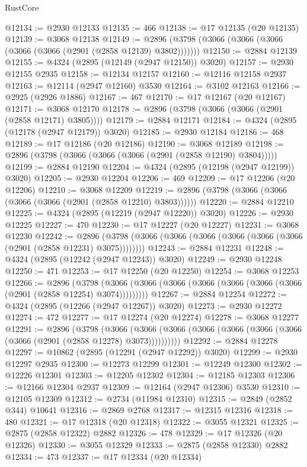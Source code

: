 \begin{lexlean}{RustCore}
\begin{coremodule}
@12134 := @2930 @12133
@12135 := 466
@12138 := @17 @12135 (@20 @12135)
@12139 := @3068 @12138
@12149 := @2896 (@3798 (@3066 (@3066 (@3066 (@3066 (@3066 (@2901 (@2858 @12139) @3802)))))))
@12150 := @2884 @12139
@12155 := @4324 (@2895 (@12149 (@2947 @12150)) @3020)
@12157 := @2930 @12155 @2935
@12158 := @12134 @12157
@12160 := @12116 @12158 @2937
@12163 := @12114 (@2947 @12160) @3530
@12164 := @3102 @12163
@12166 := @2925 (@2926 @1886)
@12167 := 467
@12170 := @17 @12167 (@20 @12167)
@12171 := @3068 @12170
@12178 := @2896 (@3798 (@3066 (@3066 (@2901 (@2858 @12171) @3805))))
@12179 := @2884 @12171
@12184 := @4324 (@2895 (@12178 (@2947 @12179)) @3020)
@12185 := @2930 @12184
@12186 := 468
@12189 := @17 @12186 (@20 @12186)
@12190 := @3068 @12189
@12198 := @2896 (@3798 (@3066 (@3066 (@3066 (@2901 (@2858 @12190) @3804)))))
@12199 := @2884 @12190
@12204 := @4324 (@2895 (@12198 (@2947 @12199)) @3020)
@12205 := @2930 @12204
@12206 := 469
@12209 := @17 @12206 (@20 @12206)
@12210 := @3068 @12209
@12219 := @2896 (@3798 (@3066 (@3066 (@3066 (@3066 (@2901 (@2858 @12210) @3803))))))
@12220 := @2884 @12210
@12225 := @4324 (@2895 (@12219 (@2947 @12220)) @3020)
@12226 := @2930 @12225
@12227 := 470
@12230 := @17 @12227 (@20 @12227)
@12231 := @3068 @12230
@12242 := @2896 (@3798 (@3066 (@3066 (@3066 (@3066 (@3066 (@3066 (@2901 (@2858 @12231) @3075))))))))
@12243 := @2884 @12231
@12248 := @4324 (@2895 (@12242 (@2947 @12243)) @3020)
@12249 := @2930 @12248
@12250 := 471
@12253 := @17 @12250 (@20 @12250)
@12254 := @3068 @12253
@12266 := @2896
    (@3798 (@3066 (@3066 (@3066 (@3066 (@3066 (@3066 (@3066 (@2901 (@2858 @12254) @3074)))))))))
@12267 := @2884 @12254
@12272 := @4324 (@2895 (@12266 (@2947 @12267)) @3020)
@12273 := @2930 @12272
@12274 := 472
@12277 := @17 @12274 (@20 @12274)
@12278 := @3068 @12277
@12291 := @2896
    (@3798
      (@3066 (@3066 (@3066 (@3066 (@3066 (@3066 (@3066 (@3066 (@2901 (@2858 @12278) @3073))))))))))
@12292 := @2884 @12278
@12297 := @10862 (@2895 (@12291 (@2947 @12292)) @3020)
@12299 := @2930 @12297 @2935
@12300 := @12273 @12299
@12301 := @12249 @12300
@12302 := @12226 @12301
@12303 := @12205 @12302
@12304 := @12185 @12303
@12306 := @12166 @12304 @2937
@12309 := @12164 (@2947 @12306) @3530
@12310 := @12105 @12309
@12312 := @2734 (@11984 @12310)
@12315 := @2849 (@2852 @344) @10641
@12316 := @2869 @2768
@12317 := @12315 @12316
@12318 := 480
@12321 := @17 @12318 (@20 @12318)
@12322 := @3055 @12321
@12325 := @2875 (@2858 @12322) @2882
@12326 := 478
@12329 := @17 @12326 (@20 @12326)
@12330 := @3055 @12329
@12333 := @2875 (@2858 @12330) @2882
@12334 := 473
@12337 := @17 @12334 (@20 @12334)

\end{coremodule}
\end{lexlean}
